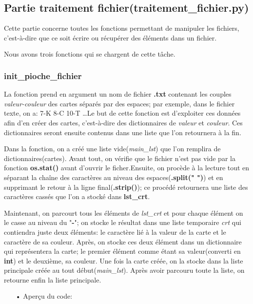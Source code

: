 	\subsection{Partie traitement fichier(traitement\_fichier.py)}
	Cette partie concerne toutes les fonctions permettant de manipuler les fichiers, c'est-à-dire que ce soit écrire ou récupérer des éléments dans un fichier.
\par Nous avons trois fonctions qui se chargent de cette tâche.
	\subsubsection{init\_pioche\_fichier}
	La fonction prend en argument un nom de fichier \textbf{.txt} contenant les couples \emph{valeur-couleur} des cartes séparés par des espaces; par exemple, dans le fichier texte, on a: 7-K 8-C 10-T \ldots Le but de cette fonction est d'exploiter ces données afin d'en créer des cartes, c'est-à-dire des dictionnaires de \emph{valeur} et \emph{couleur}. Ces dictionnaires seront ensuite contenus dans une liste que l'on retournera à la fin.
	\par Dans la fonction, on a créé une liste vide(\emph{main\_lst}) que l'on remplira de dictionnaires(cartes). Avant tout, on vérifie que le fichier n'est pas vide par la fonction \textbf{os.stat()} avant d'ouvrir le ficher.Ensuite, on procède à la lecture tout en séparant la chaîne des caractères au niveau des espaces(\textbf{.split(" ")}) et en supprimant le retour à la ligne final(\textbf{.strip()}); ce procédé retournera une liste des caractères cassés que l'on a stocké dans \textbf{lst\_crt}.
	\par Maintenant, on parcourt tous les éléments de \emph{lst\_crt} et pour chaque élément on le casse au niveau du "\textbf{-}"; on stocke le résultat dans une liste temporaire \emph{crt} qui contiendra juste deux éléments: le caractère lié à la valeur de la carte et le caractère de sa couleur. Après, on stocke ces deux élément dans un dictionnaire qui représentera la carte; le premier élément comme étant sa valeur(converti en \textbf{int}) et le deuxième, sa couleur. Une fois la carte créée, on la stocke dans la liste principale créée au tout début(\emph{main\_lst}). Après avoir parcouru toute la liste, on retourne enfin la liste principale.
	\\
	\begin{itemize}
	\color{blue}\item[•]Aperçu du code:
	\end{itemize}
	
